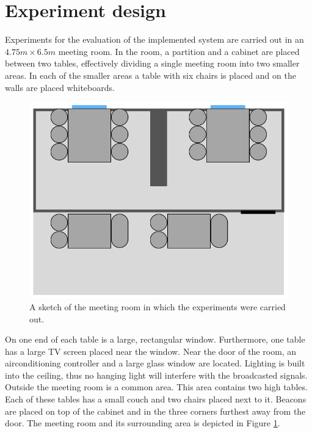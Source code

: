 \section{Experiment design}\label{sec:experiment_design}
Experiments for the evaluation of the implemented system are carried out in an $4.75m \times 6.5m$ meeting room.
In the room, a partition and a cabinet are placed between two tables, effectively dividing a single meeting room into two smaller areas. 
In each of the smaller areas a table with six chairs is placed and on the walls are placed whiteboards.
\begin{figure}[h]
    \centering
    \includegraphics[scale=0.7]{images/experiment_room.png}
    \caption{A sketch of the meeting room in which the experiments were carried out.}
    \label{fig:experiment_room}
\end{figure}
On one end of each table is a large, rectangular window.
Furthermore, one table has a large TV screen placed near the window. 
Near the door of the room, an airconditioning controller and a large glass window are located.
Lighting is built into the ceiling, thus no hanging light will interfere with the broadcasted signals. 
Outside the meeting room is a common area.
This area contains two high tables.
Each of these tables has a small couch and two chairs placed next to it.
Beacons are placed on top of the cabinet and in the three corners furthest away from the door.   
The meeting room and its surrounding area is depicted in Figure \ref{fig:experiment_room}.
